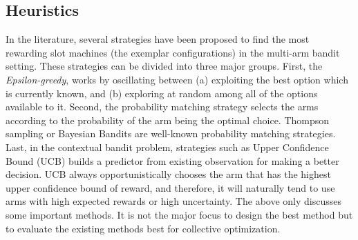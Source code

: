 \subsection{Heuristics}
\label{sec:methods}

In the literature, several strategies have been proposed to find the most rewarding slot machines (the exemplar configurations) in the multi-arm bandit setting.
These strategies can be divided into three major groups.
First, the \textit{Epsilon-greedy}, works by oscillating between (a) exploiting the best option which is currently known, and (b) exploring at random among all of the options available to it.
Second, the probability matching strategy selects the arms according to the probability of the arm being the optimal choice.
Thompson sampling or Bayesian Bandits are well-known probability matching strategies.
Last, in the contextual bandit problem, strategies such as Upper Confidence Bound (UCB) builds a predictor from existing observation for making a better decision.
UCB always opportunistically chooses the arm that has the highest upper confidence bound of reward, and therefore, it will naturally tend to use arms with high
expected rewards or high uncertainty.
The above only discusses some important methods.
It is not the major focus to design the best method but to evaluate the existing methods best for collective optimization.